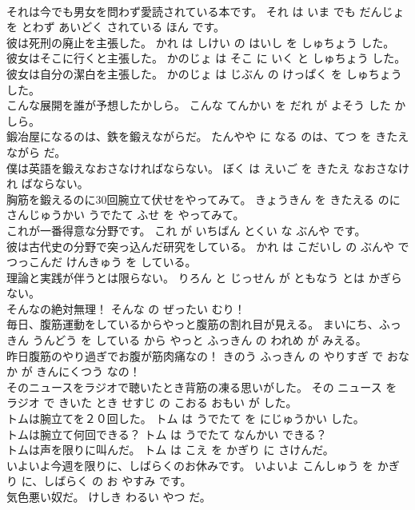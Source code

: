 \documentclass[8pt]{extreport}
\begin{document}
\begin{CJK}{UTF8}{min}
\\	それは今でも男女を問わず愛読されている本です。	それ は いま でも だんじょ を とわず あいどく されている ほん です。	
\\	彼は死刑の廃止を主張した。	かれ は しけい の はいし を しゅちょう した。	
\\	彼女はそこに行くと主張した。	かのじょ は そこ に いく と しゅちょう した。	
\\	彼女は自分の潔白を主張した。	かのじょ は じぶん の けっぱく を しゅちょう した。	
\\	こんな展開を誰が予想したかしら。	こんな てんかい を だれ が よそう した かしら。	
\\	鍛冶屋になるのは、鉄を鍛えながらだ。	たんやや に なる のは、てつ を きたえながら だ。	
\\	僕は英語を鍛えなおさなければならない。	ぼく は えいご を きたえ なおさなけれ ばならない。	
\\	胸筋を鍛えるのに30回腕立て伏せをやってみて。	きょうきん を きたえる のに さんじゅうかい うでたて ふせ を やってみて。	
\\	これが一番得意な分野です。	これ が いちばん とくい な ぶんや です。	
\\	彼は古代史の分野で突っ込んだ研究をしている。	かれ は こだいし の ぶんや で つっこんだ けんきゅう を している。	
\\	理論と実践が伴うとは限らない。	りろん と じっせん が ともなう とは かぎらない。	
\\	そんなの絶対無理！	そんな の ぜったい むり！	
\\	毎日、腹筋運動をしているからやっと腹筋の割れ目が見える。	まいにち、ふっきん うんどう を している から やっと ふっきん の われめ が みえる。	
\\	昨日腹筋のやり過ぎでお腹が筋肉痛なの！	きのう ふっきん の やりすぎ で おなか が きんにくつう なの！	
\\	そのニュースをラジオで聴いたとき背筋の凍る思いがした。	その ニュース を ラジオ で きいた とき せすじ の こおる おもい が した。	
\\	トムは腕立てを２０回した。	トム は うでたて を にじゅうかい した。	
\\	トムは腕立て何回できる？	トム は うでたて なんかい できる？	
\\	トムは声を限りに叫んだ。	トム は こえ を かぎり に さけんだ。	
\\	いよいよ今週を限りに、しばらくのお休みです。	いよいよ こんしゅう を かぎり に、しばらく の お やすみ です。	
\\	気色悪い奴だ。	けしき わるい やつ だ。	

\end{CJK}
\end{document}
